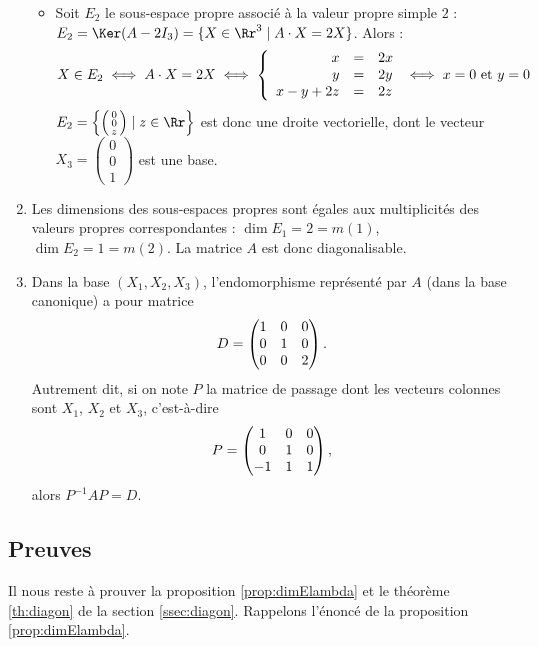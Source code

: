 \documentclass[12pt, class=report,crop=false]{standalone}
\begin{document}
\begin{exemple}
\begin{enumerate}
\begin{itemize}
    
    \item Soit $E_2$ le sous-espace propre associé à la valeur propre simple $2$ : $E_2 = \Ker(A-2I_3) = \{ X \in\Rr^3 \mid  A\cdot X=2X\}$. Alors : 
$$X\in E_2\iff A\cdot X=2X \iff \left\{\begin{array}{rcl}
x&=&2x\cr 
y&=&2y\cr 
x-y+2z&=&2z
\end{array}\right.\iff x=0 \text{ et } y=0$$
$E_2 = \left\lbrace\left(\begin{smallmatrix}0\\0\\z\end{smallmatrix}\right) \mid z \in \Rr\right\rbrace$ est donc une droite vectorielle, dont le vecteur $X_3=\left(\begin{smallmatrix}0\\0\\1\end{smallmatrix}\right)$ est une base.

    
  \end{itemize}
  
  
  \item Les dimensions des sous-espaces propres sont égales aux  multiplicités des valeurs propres correspondantes :
  $\dim E_1 = 2 = m(1)$, $\dim E_2 = 1 = m(2)$. La matrice $A$ est donc diagonalisable.
  
  
  \item Dans la base $(X_1, X_2, X_3)$, l'endomorphisme représenté par $A$ (dans la base canonique) a pour matrice
$$D=\left(\begin{matrix}1&0&0\cr 0&1&0\cr 0&0&2\end{matrix}\right).$$
Autrement dit, si on note $P$ la matrice de passage dont les vecteurs colonnes sont $X_1$, $X_2$ et $X_3$, c'est-à-dire
$$P=\begin{pmatrix}1&0&0\cr 0&1&0\cr -1&1&1\end{pmatrix},$$
alors $P^{-1}AP=D$.
\end{enumerate}

\end{exemple}



\subsection{Preuves}
\label{ssec:preuvesdiagon}

Il nous reste à prouver la proposition \ref{prop:dimElambda} et le théorème \ref{th:diagon} de la section \ref{ssec:diagon}.
Rappelons l'énoncé de la proposition \ref{prop:dimElambda}.
\end{document}
